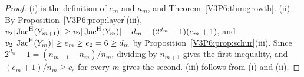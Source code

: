 \begin{proof}
(i) is the definition of $e_m$ and $\kappa_m$, and Theorem~\ref{V3P6:thm:growth}.
(ii) By Proposition~\ref{V3P6:prop:layer}(iii),
$v_2|\operatorname{Jac}^{\mathrm{H}}(Y_{m+1})|\ge v_2|\operatorname{Jac}^{\mathrm{H}}(Y_m)|-d_m+(2^{d_m}-1)(e_m+1)$, and
$v_2|\operatorname{Jac}^{\mathrm{H}}(Y_m)|\ge e_m\ge e_2=6\ge d_m$ by Proposition~\ref{V3P6:prop:schur}(iii). Since
$2^{d_m}-1=(n_{m+1}-n_m)/n_m$, dividing by $n_{m+1}$ gives the first inequality, and
$(e_m+1)/n_m\ge c_e$ for every $m$ gives the second. (iii) follows from (i) and (ii).
\end{proof}

\begin{table}[ht]
\centering\small
\renewcommand{\arraystretch}{1.15}
\caption{The $2$-part of the Hecke Jacobian along the canonical tower. ``$2^{k}\colon c$'' means
$c$ invariant factors of $2$-adic valuation exactly $k$. Lines (SM), (V2), (E), (FD), (TB) of
\texttt{code/v3p6\_v2\_growth.py}.}\label{V3P6:tab:twopart}
\end{table}

